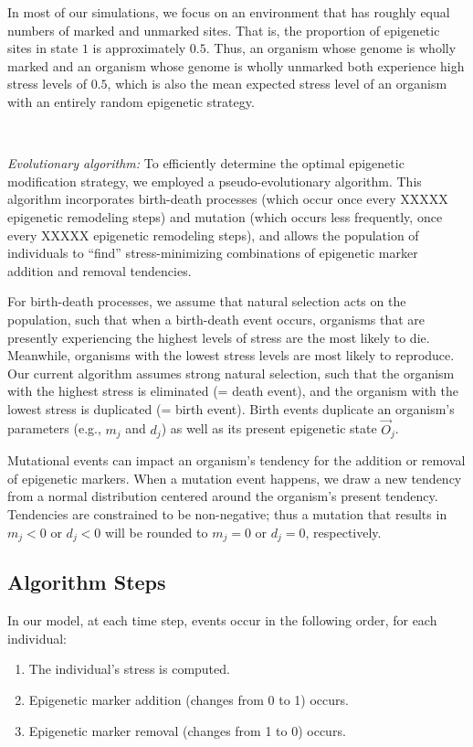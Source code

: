 \documentclass{article}
\begin{document}
In most of our simulations, we focus on an environment that has roughly equal numbers of marked and unmarked sites. That is, the proportion of epigenetic sites in state $1$ is approximately $0.5$. Thus, an organism whose genome is wholly marked and an organism whose genome is wholly unmarked both experience high stress levels of $0.5$, which is also the mean expected stress level of an organism with an entirely random epigenetic strategy. %

\ 




\noindent \textit{Evolutionary algorithm:} To efficiently determine the optimal epigenetic modification strategy, we employed a pseudo-evolutionary algorithm. This algorithm incorporates birth-death processes (which occur once every XXXXX epigenetic remodeling steps) and mutation (which occurs less frequently, once every XXXXX epigenetic remodeling steps), and allows the population of individuals to ``find'' stress-minimizing combinations of epigenetic marker addition and removal tendencies.

For birth-death processes, we assume that natural selection acts on the population, such that when a birth-death event occurs, organisms that are presently experiencing the highest levels of stress are the most likely to die. Meanwhile, organisms with the lowest stress levels are most likely to reproduce. Our current algorithm assumes strong natural selection, such that the organism with the highest stress is eliminated (= death event), and the organism with the lowest stress is duplicated (= birth event). Birth events duplicate an organism's parameters (e.g., $m_j$ and $d_j$) as well as its present epigenetic state $\vec{O}_j$.

Mutational events can impact an organism's tendency for the addition or removal of epigenetic markers. When a mutation event happens, we draw a new tendency from a normal distribution centered around the organism's present tendency. Tendencies are constrained to be non-negative; thus a mutation that results in $m_j<0$ or $d_j<0$ will be rounded to $m_j=0$ or $d_j=0$, respectively.


\subsection{Algorithm Steps}
In our model, at each time step, events occur in the following order, for each individual:
\begin{enumerate}
    \item The individual's stress is computed.
    \item Epigenetic marker addition (changes from 0 to 1) occurs.
    \item Epigenetic marker removal (changes from 1 to 0) occurs.
\end{enumerate}
\end{document}
